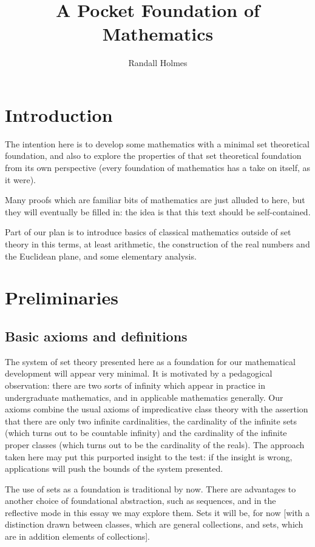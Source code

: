 \documentclass[12pt]{article}
\title{A Pocket Foundation of Mathematics}
\author{Randall Holmes}
\begin{document}
\maketitle

\section{Introduction}

The intention here is to develop some mathematics with a minimal set theoretical foundation, and also to explore the properties of that set theoretical foundation from its own perspective
(every foundation of mathematics has a take on itself, as it were).

Many proofs which are familiar bits of mathematics are just alluded to here, but they will eventually be filled in:  the idea is that this text should be self-contained.

Part of our plan is to introduce basics of classical mathematics outside of set theory in this terms, at least arithmetic, the construction of the real numbers and the Euclidean plane, and some elementary analysis.

\section{Preliminaries}

\subsection{Basic axioms and definitions}

The system of set theory presented here as a foundation for our mathematical development will appear very minimal.  It is motivated by a pedagogical observation:  there are two sorts of infinity which appear in practice in undergraduate mathematics, and in applicable mathematics generally.  Our axioms combine the usual axioms of impredicative class theory with the assertion that there are only two infinite cardinalities, the cardinality of the infinite sets (which turns out to be countable infinity) and the cardinality of the infinite proper classes (which turns out to be the cardinality of the reals).  The approach taken here may put this purported insight to the test:  if the insight is wrong, applications will push the bounds of the system presented.

The use of sets as a foundation is traditional by now.  There are advantages to another choice of foundational abstraction, such as sequences, and in the reflective mode in this essay we may explore them.  Sets it will be, for now [with a distinction drawn between classes, which are general collections, and sets, which are in addition elements of collections].
\end{document}
